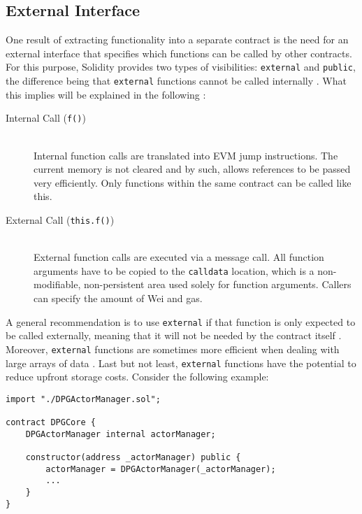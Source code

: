 \subsection{External Interface}
\label{sec:externalInterface}
One result of extracting functionality into a separate contract is the need for an external interface that specifies which functions can be called by other contracts. For this purpose, Solidity provides two types of visibilities: \texttt{external} and \texttt{public}, the difference being that \texttt{external} functions cannot be called internally \cite[p.~77]{solidityDocs}. What this implies will be explained in the following \cite[pp.~57, 69]{solidityDocs}:

\begin{description}
	\item[Internal Call (\texttt{f()})]
	\hfill \\
	Internal function calls are translated into \ac{EVM} jump instructions. The current memory is not cleared and by such, allows references to be passed very efficiently. Only functions within the same contract can be called like this.
	\item[External Call (\texttt{this.f()})]
	\hfill \\
	External function calls are executed via a message call. All function arguments have to be copied to the \texttt{calldata} location, which is a non-modifiable, non-persistent area used solely for function arguments. Callers can specify the amount of Wei and gas. 
\end{description}

A general recommendation is to use \texttt{external} if that function is only expected to be called externally, meaning that it will not be needed by the contract itself \cite{externalPublic}. Moreover, \texttt{external} functions are sometimes more efficient when dealing with large arrays of data \cite[p.~77]{solidityDocs}. Last but not least, \texttt{external} functions have the potential to reduce upfront storage costs. Consider the following example:

\begin{lstlisting}[language=Solidity, caption=Sharing external contract interface via inheritance, label=lst:actorManagerReference]
import "./DPGActorManager.sol";

contract DPGCore {
	DPGActorManager internal actorManager;
	
	constructor(address _actorManager) public {
		actorManager = DPGActorManager(_actorManager);
		...
	}
}
\end{lstlisting}

